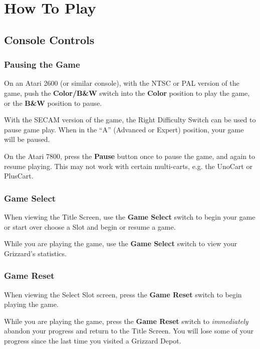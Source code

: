 \documentclass[9pt,twocolumn,openany,article]{memoir}
\begin{document}
\chapter{How To Play}

\section{Console Controls}

\subsection{Pausing the Game}

On an Atari 2600  (or similar console), with the NTSC  or PAL version of
the game,  push the  \textbf{Color/B\&W} switch into  the \textbf{Color}
position  to play  the game,  or  the \textbf{B\&W}  position to  pause.

With the SECAM  version of the game, the Right  Difficulty Switch can be
used  to  pause game  play.  When  in  the  ``A'' (Advanced  or  Expert)
position, your  game will be paused.

On the  Atari 7800, press  the \textbf{Pause}  button once to  pause the
game, and again to resume playing. \ifdefined\ATARIAGESAVE\else This may
not work with certain multi-carts, e.g. the UnoCart or PlusCart. \fi

\subsection{Game Select}

When viewing  the Title Screen,  use the \textbf{Game Select}  switch to
\ifdefined\NOSAVE begin your game or start  over \else choose a Slot and
begin or resume a game. \fi

While you  are playing the  game, use the  \textbf{Game Select}
switch to view your Grizzard's  statistics.

\subsection{Game Reset}

When  viewing the  Select  Slot screen,  press  the \textbf{Game  Reset}
switch to begin playing the game.

While you are playing the game,  press the \textbf{Game Reset} switch to
\emph{immediately} abandon your progress and return to the Title Screen.
You will  lose some  of your  progress since the  last time  you visited
a Grizzard Depot.
\end{document}
